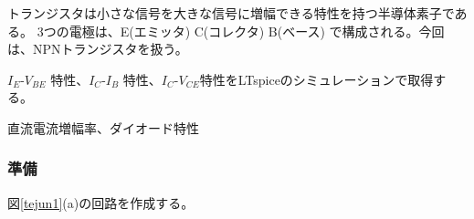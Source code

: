 トランジスタは小さな信号を大きな信号に増幅できる特性を持つ半導体素子である。
3つの電極は、E(エミッタ) C(コレクタ) B(ベース) で構成される。今回は、NPNトランジスタを扱う。

\begin{description}
  \setlength{\parskip}{0cm} %
  \setlength{\itemsep}{0cm} %
  \item[ゴール] $I_E$-$V_{BE}$ 特性、$I_C$-$I_B$ 特性、$I_C$-$V_{CE}$特性をLTspiceのシミュレーションで取得する。
  \item[キーワード] 直流電流増幅率、ダイオード特性
\end{description}

\subsubsection{準備}
図\ref{tejun1}(a)の回路を作成する。

